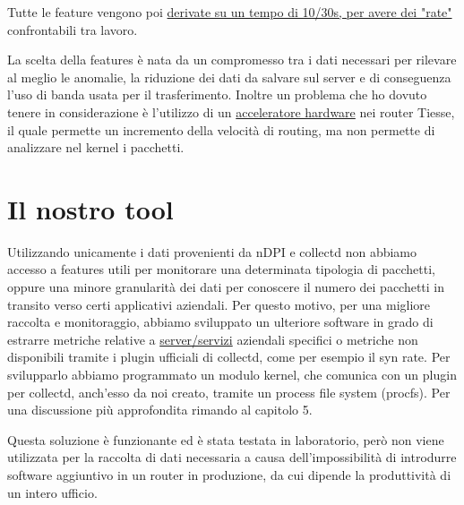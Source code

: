 Tutte le feature vengono poi \uline{derivate su un tempo di 10/30s, per avere dei "rate"} confrontabili tra lavoro.

La scelta della features è nata da un compromesso tra i dati necessari per rilevare al meglio le anomalie, la riduzione dei dati da salvare sul server e di conseguenza l'uso di banda usata per il trasferimento. Inoltre un problema che ho dovuto tenere in considerazione è l'utilizzo di un \underline{acceleratore hardware} nei router Tiesse, il quale permette un incremento della velocità di routing, ma non permette di analizzare nel kernel i pacchetti.
 
\section{Il nostro tool}
\label{section:our_tool}

Utilizzando unicamente i dati provenienti da nDPI e collectd non abbiamo accesso a features utili per monitorare una determinata tipologia di pacchetti, oppure una minore granularità dei dati per conoscere il numero dei pacchetti in transito verso certi applicativi aziendali. Per questo motivo, per una migliore raccolta e monitoraggio, abbiamo sviluppato un ulteriore software in grado di estrarre metriche relative a \uline{server/servizi} aziendali specifici o metriche non disponibili tramite i plugin ufficiali di collectd, come per esempio il syn rate. Per svilupparlo abbiamo programmato un modulo kernel, che comunica con un plugin per collectd, anch'esso da noi creato, tramite un process file system (procfs). Per una discussione più approfondita rimando al capitolo 5.

Questa soluzione è funzionante ed è stata testata in laboratorio, però non viene utilizzata per la raccolta di dati necessaria a causa dell'impossibilità di introdurre software aggiuntivo in un router in produzione, da cui dipende la produttività di un intero ufficio. 
 
 
